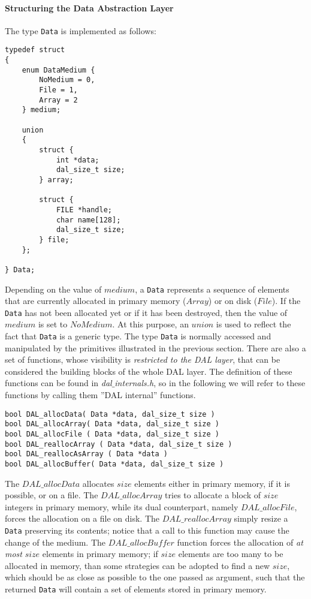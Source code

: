 \paragraph{Structuring the Data Abstraction Layer}
The type \texttt{Data} is implemented as follows:
\begin{lstlisting}
typedef struct
{
	enum DataMedium {
		NoMedium = 0,
		File = 1,
		Array = 2
	} medium;
	
	union 
	{
		struct {
			int *data;
			dal_size_t size;
		} array;
		
		struct {
			FILE *handle;
			char name[128];
			dal_size_t size;
		} file;
	};
	
} Data;
\end{lstlisting}
Depending on the value of $medium$, a \texttt{Data} represents a sequence of elements that are currently allocated in primary memory ($Array$) or on disk ($File$). If the \texttt{Data} has not been allocated yet or if it has been destroyed, then the value of $medium$ is set to $NoMedium$. At this purpose, an $union$ is used to reflect the fact that \texttt{Data} is a generic type. The type \texttt{Data} is normally accessed and manipulated by the primitives illustrated in the previous section. There are also a set of functions, whose visibility is \textit{restricted to the DAL layer}, that can be considered the building blocks of the whole DAL layer. The definition of these functions can be found in \textit{dal$\_$internals.h}, so in the following we will refer to these functions by calling them ''DAL internal'' functions.
\begin{lstlisting}
bool DAL_allocData( Data *data, dal_size_t size )
bool DAL_allocArray( Data *data, dal_size_t size )
bool DAL_allocFile ( Data *data, dal_size_t size )
bool DAL_reallocArray ( Data *data, dal_size_t size )
bool DAL_reallocAsArray ( Data *data )
bool DAL_allocBuffer( Data *data, dal_size_t size )
\end{lstlisting}
The $DAL\_allocData$ allocates $size$ elements either in primary memory, if it is possible, or on a file. The $DAL\_allocArray$ tries to allocate a block of $size$ integers in primary memory, while its dual counterpart, namely $DAL\_allocFile$, forces the allocation on a file on disk. The $DAL\_reallocArray$ simply resize a \texttt{Data} preserving its contents; notice that a call to this function may cause the change of the medium. The $DAL\_allocBuffer$ function forces the allocation of \textit{at most} $size$ elements in primary memory; if $size$ elements are too many to be allocated in memory, than some strategies can be adopted to find a new $size$, which should be as close as possible to the one passed as argument, such that the returned \texttt{Data} will contain a set of elements stored in primary memory.
